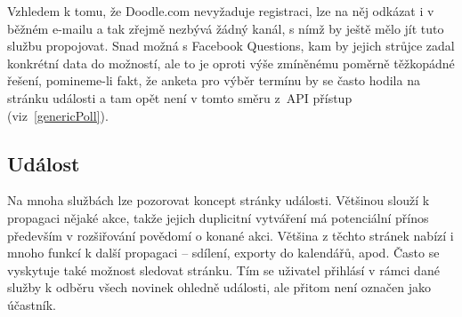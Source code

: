 \documentclass[12pt,oneside,final]{fithesis2}
\begin{document}
Vzhledem k tomu, že Doodle.com nevyžaduje registraci, lze na něj odkázat i v běžném e-mailu a tak zřejmě nezbývá žádný kanál, s nímž by ještě mělo jít tuto službu propojovat. Snad možná s Facebook Questions, kam by jejich strůjce zadal konkrétní data do možností, ale to je oproti výše zmíněnému poměrně těžkopádné řešení, pomineme-li fakt, že anketa pro výběr termínu by se často hodila na stránku události a tam opět není v tomto směru z~API přístup (viz~\ref{genericPoll}).

\subsection{Událost}\label{eventPage}
Na mnoha službách lze pozorovat koncept stránky události. Většinou slouží k propagaci nějaké akce, takže jejich duplicitní vytváření má potenciální přínos především v rozšiřování povědomí o konané akci. Většina z těchto stránek nabízí i mnoho funkcí k další propagaci -- sdílení, exporty do kalendářů, apod. Často se vyskytuje také možnost sledovat stránku. Tím se uživatel přihlásí v rámci dané služby k odběru všech novinek ohledně události, ale přitom není označen jako účastník.
\end{document}
